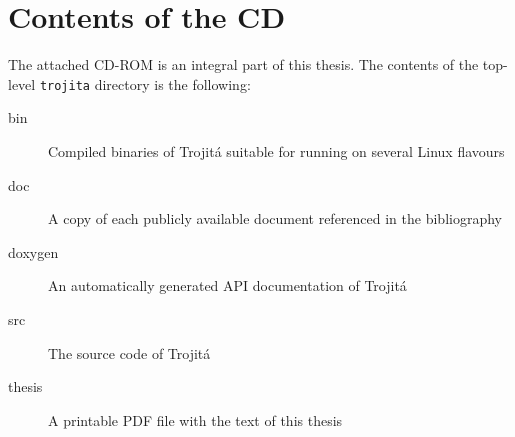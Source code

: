 \documentclass[trojita]{subfiles}
\begin{document}
\chapter{Contents of the CD}
\label{sec:source-cd}


The attached CD-ROM is an integral part of this thesis.  The contents of the
top-level {\tt trojita} directory is the following:

\begin{description}
    \item[bin] Compiled binaries of Trojitá suitable for running on several
        Linux flavours
    \item[doc] A copy of each publicly available document referenced in the
        bibliography
    \item[doxygen] An automatically generated API documentation of Trojitá
    \item[src] The source code of Trojitá
    \item[thesis] A printable PDF file with the text of this thesis
\end{description}
\end{document}
